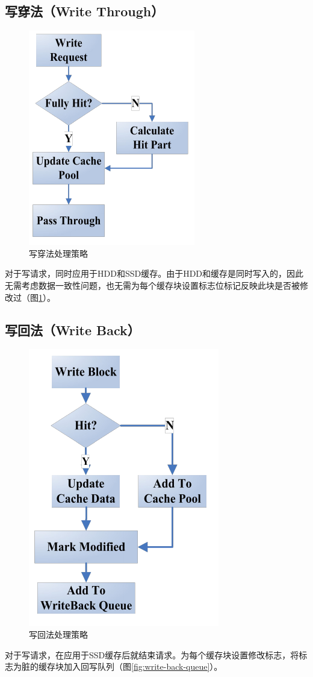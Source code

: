 \subsection{写穿法（Write Through）}
\begin{figure}[H]
\centering
\includegraphics[width=0.4\linewidth]{./graph/write-through}
\caption{写穿法处理策略}
\label{fig:write-through}
\end{figure}

对于写请求，同时应用于HDD和SSD缓存。由于HDD和缓存是同时写入的，因此无需考虑数据一致性问题，也无需为每个缓存块设置标志位标记反映此块是否被修改过（图\ref{fig:write-through}）。

\subsection{写回法（Write Back）}
\begin{figure}[H]
\centering
\includegraphics[width=0.4\linewidth]{./graph/write-back}
\caption{写回法处理策略}
\label{fig:write-back}
\end{figure}

对于写请求，在应用于SSD缓存后就结束请求。为每个缓存块设置修改标志，将标志为脏的缓存块加入回写队列（图\ref{fig:write-back-queue}）。

